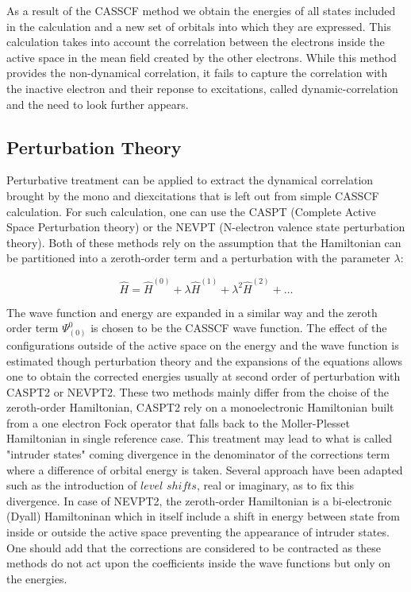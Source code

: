 \documentclass[10pt]{report}
\numberwithin{equation}{section}
\begin{document}
As a result of the CASSCF method we obtain the energies of all states included in the calculation and a new set of orbitals into which they are expressed. 
This calculation takes into account the correlation between the electrons inside the active space in the mean field created by the other electrons. 
While this method provides the non-dynamical correlation, it fails to capture the correlation with the inactive electron and their reponse to excitations, called dynamic-correlation and the need to look further appears.


\subsection{Perturbation Theory}

Perturbative treatment can be applied to extract the dynamical correlation brought by the mono and diexcitations that is left out from simple CASSCF calculation. For such calculation, one can use the CASPT (Complete Active Space Perturbation theory)
or the NEVPT (N-electron valence state perturbation theory). Both of these methods rely on the assumption that the Hamiltonian can be partitioned into a zeroth-order term and a perturbation with the parameter $\lambda$:

\begin{equation}
    \hat{H}=\hat{H}^{(0)}+\lambda\hat{H}^{(1)}+\lambda^2 \hat{H}^{(2)}+\ldots
\end{equation}


The wave function and energy are expanded in a similar way and the zeroth order term $\Psi_{(0)}^{0}$ is chosen to be the CASSCF wave function. 
The effect of the configurations outside of the active space on the energy and the wave function is estimated though perturbation theory and the expansions of the equations allows one to obtain the corrected energies
usually at second order of perturbation with CASPT2 or NEVPT2. These two methods mainly differ from the choise of the zeroth-order Hamiltonian, CASPT2 rely on a monoelectronic Hamiltonian built from a one electron Fock operator that falls back to the Moller-Plesset Hamiltonian in single reference case. 
This treatment may lead to what is called "intruder states" coming divergence in the denominator of the corrections term where a difference of orbital energy is taken. Several approach have been adapted such as the introduction of  $level$ $shifts$, real or imaginary, as to fix this divergence.
In case of NEVPT2, the zeroth-order Hamiltonian is a bi-electronic (Dyall) Hamiltoninan which in itself include a shift in energy between state from inside or outside the active space preventing the appearance of intruder states.
One should add that the corrections are considered to be contracted as these methods do not act upon the coefficients inside the wave functions but only on the energies.
\end{document}
